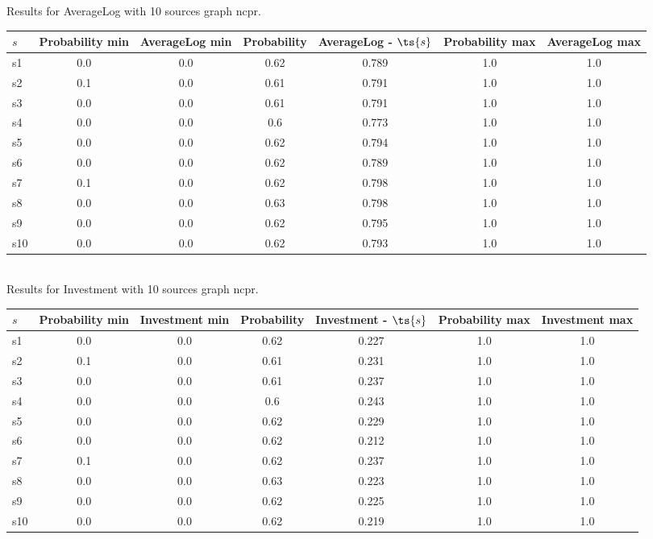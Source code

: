 \documentclass{article}
\begin{document}
\noindent Results for AverageLog with 10 sources graph ncpr.

\noindent\begin{tabular}{|l|c|c|c|c|c|c|}
\hline
$s$& Probability min & AverageLog min & Probability & AverageLog - $\ts{s}$ & Probability max & AverageLog max\\
\hline
s1 &0.0 & 0.0 & 0.62 & 0.789 & 1.0 & 1.0\\
\hline
s2 &0.1 & 0.0 & 0.61 & 0.791 & 1.0 & 1.0\\
\hline
s3 &0.0 & 0.0 & 0.61 & 0.791 & 1.0 & 1.0\\
\hline
s4 &0.0 & 0.0 & 0.6 & 0.773 & 1.0 & 1.0\\
\hline
s5 &0.0 & 0.0 & 0.62 & 0.794 & 1.0 & 1.0\\
\hline
s6 &0.0 & 0.0 & 0.62 & 0.789 & 1.0 & 1.0\\
\hline
s7 &0.1 & 0.0 & 0.62 & 0.798 & 1.0 & 1.0\\
\hline
s8 &0.0 & 0.0 & 0.63 & 0.798 & 1.0 & 1.0\\
\hline
s9 &0.0 & 0.0 & 0.62 & 0.795 & 1.0 & 1.0\\
\hline
s10 &0.0 & 0.0 & 0.62 & 0.793 & 1.0 & 1.0\\
\hline
\end{tabular}\\

\noindent Results for Investment with 10 sources graph ncpr.

\noindent\begin{tabular}{|l|c|c|c|c|c|c|}
\hline
$s$& Probability min & Investment min & Probability & Investment - $\ts{s}$ & Probability max & Investment max\\
\hline
s1 &0.0 & 0.0 & 0.62 & 0.227 & 1.0 & 1.0\\
\hline
s2 &0.1 & 0.0 & 0.61 & 0.231 & 1.0 & 1.0\\
\hline
s3 &0.0 & 0.0 & 0.61 & 0.237 & 1.0 & 1.0\\
\hline
s4 &0.0 & 0.0 & 0.6 & 0.243 & 1.0 & 1.0\\
\hline
s5 &0.0 & 0.0 & 0.62 & 0.229 & 1.0 & 1.0\\
\hline
s6 &0.0 & 0.0 & 0.62 & 0.212 & 1.0 & 1.0\\
\hline
s7 &0.1 & 0.0 & 0.62 & 0.237 & 1.0 & 1.0\\
\hline
s8 &0.0 & 0.0 & 0.63 & 0.223 & 1.0 & 1.0\\
\hline
s9 &0.0 & 0.0 & 0.62 & 0.225 & 1.0 & 1.0\\
\hline
s10 &0.0 & 0.0 & 0.62 & 0.219 & 1.0 & 1.0\\
\hline
\end{tabular}\\
\end{document}
